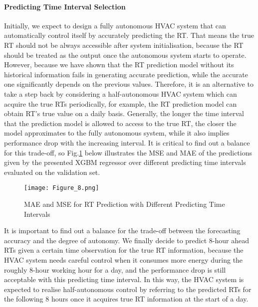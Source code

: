 \documentclass[11pt]{article}
\begin{document}
    \paragraph{Predicting Time Interval Selection}
    Initially, we expect to design a fully autonomous HVAC system that can automatically control itself by accurately predicting the RT. That means the true RT should not be always accessible after system initialisation, because the RT should be treated as the output once the autonomous system starts to operate. However, because we have shown that the RT prediction model without its historical information fails in generating accurate prediction, while the accurate one significantly depends on the previous values. Therefore, it is an alternative to take a step back by considering a half-autonomous HVAC system which can acquire the true RTs periodically, for example, the RT prediction model can obtain RT's true value on a daily basis. Generally, the longer the time interval that the prediction model is allowed to access to the true RT, the closer the model approximates to the fully autonomous system, while it also implies performance drop with the increasing interval. It is critical to find out a balance for this trade-off, so Fig.\ref{Time_interval} below illustrates the MSE and MAE of the predictions given by the presented XGBM regressor over different predicting time intervals evaluated on the validation set.

   \begin{figure}[htbp]
    	\centering
    	\texttt{[image: Figure\_8.png]}
    	\caption{MAE and MSE for RT Prediction with Different Predicting Time Intervals}
    	\label{Time_interval}
    \end{figure}   
    
    It is important to find out a balance for the trade-off between the forecasting accuracy and the degree of autonomy. We finally decide to predict 8-hour ahead RTs given a certain time observation for the true RT information, because the HVAC system needs careful control when it consumes more energy during the roughly 8-hour working hour for a day, and the performance drop is still acceptable with this predicting time interval. In this way, the HVAC system is expected to realise half-autonomous control by referring to the predicted RTs for the following 8 hours once it acquires true RT information at the start of a day.
    
\end{document}
